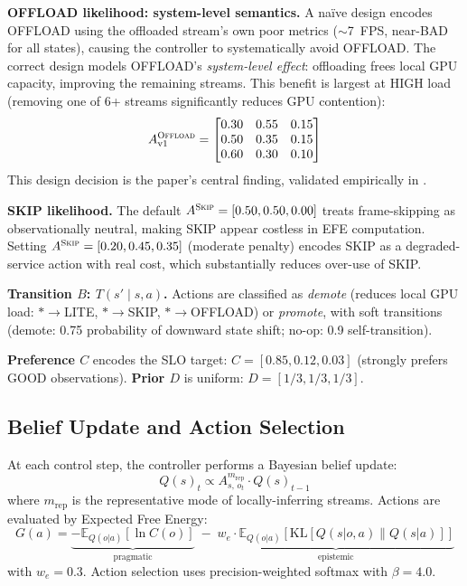 \documentclass[conference]{IEEEtran}
\begin{document}
\textbf{OFFLOAD likelihood: system-level semantics.}
A naïve design encodes OFFLOAD using the offloaded stream's own poor metrics ($\sim$7~FPS, near-BAD for all states), causing the controller to systematically avoid OFFLOAD.
The correct design models OFFLOAD's \emph{system-level effect}: offloading frees local GPU capacity, improving the remaining streams.
This benefit is largest at HIGH load (removing one of 6+ streams significantly reduces GPU contention):
\begin{equation}
    A^{\textsc{Offload}}_{\text{v1}} = \begin{bmatrix}
        0.30 & 0.55 & 0.15 \\
        0.50 & 0.35 & 0.15 \\
        0.60 & 0.30 & 0.10
    \end{bmatrix}
    \label{eq:offload_v1}
\end{equation}
This design decision is the paper's central finding, validated empirically in .

\textbf{SKIP likelihood.}
The default $A^{\textsc{Skip}} = [0.50, 0.50, 0.00]$ treats frame-skipping as observationally neutral, making SKIP appear costless in EFE computation.
Setting $A^{\textsc{Skip}} = [0.20, 0.45, 0.35]$ (moderate penalty) encodes SKIP as a degraded-service action with real cost, which substantially reduces over-use of SKIP.

\textbf{Transition $B$: $T(s' \mid s, a)$.}
Actions are classified as \emph{demote} (reduces local GPU load: $*\to$LITE, $*\to$SKIP, $*\to$OFFLOAD) or \emph{promote}, with soft transitions (demote: 0.75 probability of downward state shift; no-op: 0.9 self-transition).

\textbf{Preference $C$} encodes the SLO target: $C = [0.85, 0.12, 0.03]$ (strongly prefers GOOD observations).
\textbf{Prior $D$} is uniform: $D = [1/3, 1/3, 1/3]$.

\subsection{Belief Update and Action Selection}

At each control step, the controller performs a Bayesian belief update:
\begin{equation}
    Q(s)_t \propto A^{m_{\text{rep}}}_{s,\, o_t} \cdot Q(s)_{t-1}
    \label{eq:belief}
\end{equation}
where $m_{\text{rep}}$ is the representative mode of locally-inferring streams.
Actions are evaluated by Expected Free Energy:
\begin{equation}
    G(a) = \underbrace{-\mathbb{E}_{Q(o|a)}[\ln C(o)]}_{\text{pragmatic}} \;-\; \underbrace{w_e \cdot \mathbb{E}_{Q(o|a)}[\mathrm{KL}[Q(s|o,a) \| Q(s|a)]]}_{\text{epistemic}}
    \label{eq:efe}
\end{equation}
with $w_e = 0.3$.
Action selection uses precision-weighted softmax with $\beta = 4.0$.
\end{document}
